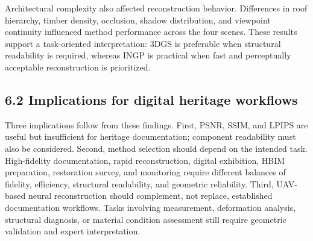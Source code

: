 Architectural complexity also affected reconstruction behavior.
Differences in roof hierarchy, timber density, occlusion, shadow
distribution, and viewpoint continuity influenced method performance
across the four scenes. These results support a task-oriented
interpretation: 3DGS is preferable when structural readability is
required, whereas INGP is practical when fast and perceptually
acceptable reconstruction is prioritized.

\subsection{6.2 Implications for digital heritage
workflows}\label{implications-for-digital-heritage-workflows}

Three implications follow from these findings. First, PSNR, SSIM, and
LPIPS are useful but insufficient for heritage documentation; component
readability must also be considered. Second, method selection should
depend on the intended task. High-fidelity documentation, rapid
reconstruction, digital exhibition, HBIM preparation, restoration
survey, and monitoring require different balances of fidelity,
efficiency, structural readability, and geometric reliability. Third,
UAV-based neural reconstruction should complement, not replace,
established documentation workflows. Tasks involving measurement,
deformation analysis, structural diagnosis, or material condition
assessment still require geometric validation and expert interpretation.

